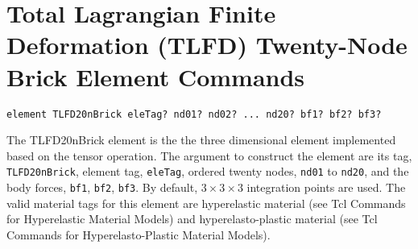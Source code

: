 \section{Total  Lagrangian Finite  Deformation  (TLFD) Twenty-Node Brick Element
Commands }


\begin{verbatim}
element TLFD20nBrick eleTag? nd01? nd02? ... nd20? bf1? bf2? bf3?
\end{verbatim}

The  TLFD20nBrick element is the the three dimensional element implemented based
on  the  tensor  operation.  The  argument to construct the element are its tag,
\texttt{TLFD20nBrick},  element  tag,  \texttt{eleTag},  ordered  twenty  nodes,
\texttt{nd01} to \texttt{nd20}, and the body forces, \texttt{bf1}, \texttt{bf2},
\texttt{bf3}. By default, $3 \times 3 \times 3$ integration points are used. The
valid material tags for this element are hyperelastic material (see Tcl Commands
for  Hyperelastic  Material  Models)  and  hyperelasto-plastic material (see Tcl
Commands for Hyperelasto-Plastic Material Models).

